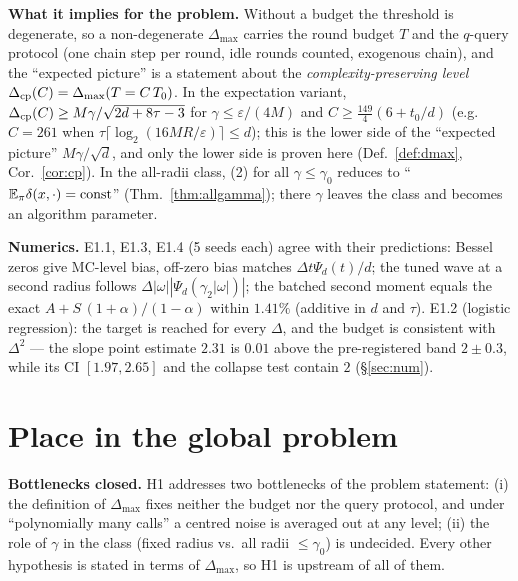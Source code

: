 \documentclass[11pt,a4paper]{article}
\numberwithin{equation}{section}
\theoremstyle{definition}
\theoremstyle{remark}
\newcommand{\E}{\mathbb E}\newcommand{\R}{\mathbb R}\newcommand{\N}{\mathbb N}\newcommand{\Prob}{\mathbb P}
\newcommand{\Dmax}{\Delta_{\max}}\newcommand{\Dcp}{\Delta_{\rm cp}}
\begin{document}
\begin{tcolorbox}[card,title={H1 in one page}]
\textbf{What it implies for the problem.} Without a budget the threshold is degenerate, so a non-degenerate $\Dmax$ carries the round budget $T$ and the $q$-query protocol (one chain step per round, idle rounds counted, exogenous chain), and the ``expected picture'' is a statement about the \emph{complexity-preserving level} $\Dcp(C)=\Dmax(T=C\,T_0)$. In the expectation variant, $\Dcp(C)\ge M\gamma/\sqrt{2d+8\tau-3}$ for $\gamma\le\varepsilon/(4M)$ and $C\ge\frac{149}4(6+t_0/d)$ (e.g.\ $C=261$ when $\tau\lceil\log_2(16MR/\varepsilon)\rceil\le d$); this is the lower side of the ``expected picture'' $M\gamma/\sqrt d$, and only the lower side is proven here (Def.~\ref{def:dmax}, Cor.~\ref{cor:cp}). In the all-radii class, (2) for all $\gamma\le\gamma_0$ reduces to ``$\E_\pi\delta(x,\cdot)={\rm const}$'' (Thm.~\ref{thm:allgamma}); there $\gamma$ leaves the class and becomes an algorithm parameter.

\textbf{Numerics.} E1.1, E1.3, E1.4 (5 seeds each) agree with their predictions: Bessel zeros give MC-level bias, off-zero bias matches $\Delta t\Psi_d(t)/d$; the tuned wave at a second radius follows $\Delta|\omega||\Psi_d(\gamma_2|\omega|)|$; the batched second moment equals the exact $A+S\,(1+\alpha)/(1-\alpha)$ within $1.41\%$ (additive in $d$ and $\tau$). E1.2 (logistic regression): the target is reached for every $\Delta$, and the budget is consistent with $\Delta^2$ --- the slope point estimate $2.31$ is $0.01$ above the pre-registered band $2\pm0.3$, while its CI $[1.97,2.65]$ and the collapse test contain $2$ (\S\ref{sec:num}).

\end{tcolorbox}

\section{Place in the global problem}\label{sec:place}
\textbf{Bottlenecks closed.} H1 addresses two bottlenecks of the problem statement:
(i) the definition of $\Dmax$ fixes neither the budget nor the query protocol, and under ``polynomially many calls'' a centred noise is averaged out at any level;
(ii) the role of $\gamma$ in the class (fixed radius vs.\ all radii $\le\gamma_0$) is undecided.
Every other hypothesis is stated in terms of $\Dmax$, so H1 is upstream of all of them.
\end{document}
